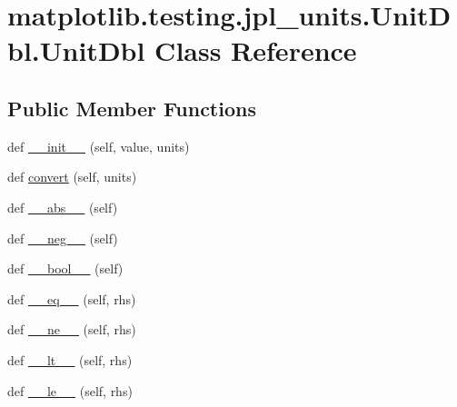 \hypertarget{classmatplotlib_1_1testing_1_1jpl__units_1_1UnitDbl_1_1UnitDbl}{}\section{matplotlib.\+testing.\+jpl\+\_\+units.\+Unit\+Dbl.\+Unit\+Dbl Class Reference}
\label{classmatplotlib_1_1testing_1_1jpl__units_1_1UnitDbl_1_1UnitDbl}
\subsection*{Public Member Functions}
\begin{DoxyCompactItemize}
\item 
def \hyperlink{classmatplotlib_1_1testing_1_1jpl__units_1_1UnitDbl_1_1UnitDbl_afafc3923bc9b131e3090d7cb6169e298}{\+\_\+\+\_\+init\+\_\+\+\_\+} (self, value, units)
\item 
def \hyperlink{classmatplotlib_1_1testing_1_1jpl__units_1_1UnitDbl_1_1UnitDbl_a7f709d800f1bbf7260a4763ed0c8ef59}{convert} (self, units)
\item 
def \hyperlink{classmatplotlib_1_1testing_1_1jpl__units_1_1UnitDbl_1_1UnitDbl_a12008256617a3ab71110bd99a43da628}{\+\_\+\+\_\+abs\+\_\+\+\_\+} (self)
\item 
def \hyperlink{classmatplotlib_1_1testing_1_1jpl__units_1_1UnitDbl_1_1UnitDbl_ac0f1fb27d24aa145302220b4442831db}{\+\_\+\+\_\+neg\+\_\+\+\_\+} (self)
\item 
def \hyperlink{classmatplotlib_1_1testing_1_1jpl__units_1_1UnitDbl_1_1UnitDbl_abdfe3a7466b3b24ed374ad6cd5bffcd5}{\+\_\+\+\_\+bool\+\_\+\+\_\+} (self)
\item 
def \hyperlink{classmatplotlib_1_1testing_1_1jpl__units_1_1UnitDbl_1_1UnitDbl_a7e509673e5c3a69b1116da9d10e6c161}{\+\_\+\+\_\+eq\+\_\+\+\_\+} (self, rhs)
\item 
def \hyperlink{classmatplotlib_1_1testing_1_1jpl__units_1_1UnitDbl_1_1UnitDbl_a0970cb98452bdf4790eafe2265364191}{\+\_\+\+\_\+ne\+\_\+\+\_\+} (self, rhs)
\item 
def \hyperlink{classmatplotlib_1_1testing_1_1jpl__units_1_1UnitDbl_1_1UnitDbl_ae30c17aa289f74713d3ae7535dd017bc}{\+\_\+\+\_\+lt\+\_\+\+\_\+} (self, rhs)
\item 
def \hyperlink{classmatplotlib_1_1testing_1_1jpl__units_1_1UnitDbl_1_1UnitDbl_a3bd6ba7428973d575859d1af51bed5bf}{\+\_\+\+\_\+le\+\_\+\+\_\+} (self, rhs)
\item 

\end{DoxyCompactItemize}
